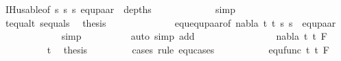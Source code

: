 \begin{isabellebody}
\ IH{\isacharunderscore}{\kern0pt}usable{\isacharbrackleft}{\kern0pt}of\ s{}{\isacharprime}{\kern0pt}\ s{}{\isacharprime}{\kern0pt}\ s{}{\isacharprime}{\kern0pt}{\isacharbrackright}{\kern0pt}\ equ{\isacharunderscore}{\kern0pt}paar{\isacharparenleft}{\kern0pt}{}{\isacharparenright}{\kern0pt}\ {}{\isacharparenleft}{\kern0pt}{}{\isacharparenright}{\kern0pt}\ depths{}\isanewline
\ \ \ \ \ \ \ \ \ \ \ \isamarkupfalse%
\ simp\isanewline
\ \ \ \ \ \ \ \ \ \isamarkupfalse%
\ t{}{\isacharunderscore}{\kern0pt}equal{\isacharunderscore}{\kern0pt}t{}\ s{}{\isacharunderscore}{\kern0pt}equal{\isacharunderscore}{\kern0pt}s{}\ \isamarkupfalse%
\ {\isacharquery}{\kern0pt}thesis\ \isanewline
\ \ \ \ \ \ \ \ \ \ \ \isamarkupfalse%
\ equ{\isachardot}{\kern0pt}equ{\isacharunderscore}{\kern0pt}paar{\isacharbrackleft}{\kern0pt}of\ nabla\ t{}{\isacharprime}{\kern0pt}\ t{}{\isacharprime}{\kern0pt}\ s{}{\isacharprime}{\kern0pt}\ s{}{\isacharprime}{\kern0pt}{\isacharbrackright}{\kern0pt}\ {}{\isacharparenleft}{\kern0pt}{}{\isacharcomma}{\kern0pt}{}{\isacharparenright}{\kern0pt}\ equ{\isacharunderscore}{\kern0pt}paar{\isacharparenleft}{\kern0pt}{}{\isacharparenright}{\kern0pt}\isanewline
\ \ \ \ \ \ \ \ \ \ \ \isamarkupfalse%
\ simp\isanewline
\ \ \ \ \ \ \ \ \isamarkupfalse%
\ {\isacharparenleft}{\kern0pt}auto\ simp\ add{\isacharcolon}{\kern0pt}\ {}{\isacharparenright}{\kern0pt}\isanewline
\ \ \ \ \ \isamarkupfalse%
\isanewline
\ \ \ \ \ \ \ \isamarkupfalse%
\ {\isacharparenleft}{\kern0pt}{}\ nabla\ t{}\ t{}\ F{\isacharparenright}{\kern0pt}\isanewline
\ \ \ \ \ \ \ \ \isamarkupfalse%
\ t{}{}\ \isamarkupfalse%
\ {\isacharquery}{\kern0pt}thesis\ \isanewline
\ \ \ \ \ \ \ \isamarkupfalse%
{\isacharparenleft}{\kern0pt}cases\ rule{\isacharcolon}{\kern0pt}\ equ{\isachardot}{\kern0pt}cases{\isacharparenright}{\kern0pt}\isanewline
\ \ \ \ \ \ \ \ \ \isamarkupfalse%
\ {\isacharparenleft}{\kern0pt}equ{\isacharunderscore}{\kern0pt}func\ t{}\ t{}\ F{\isacharparenright}{\kern0pt}\isanewline
\ \ \ \ \ \ \ \ \ \isamarkupfalse%

\end{isabellebody}
